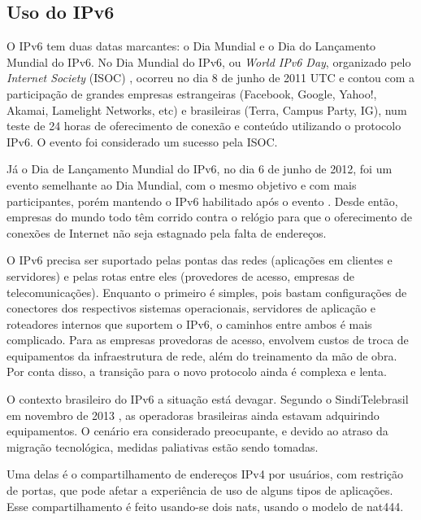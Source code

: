 
\subsection*{Uso do IPv6}

O IPv6 tem duas datas marcantes: o Dia Mundial e o Dia do Lançamento Mundial do IPv6.
No Dia Mundial do IPv6, ou \emph{World IPv6 Day}, organizado pelo
\emph{Internet Society} (ISOC) \cite{site:isoc-ipv6day}, ocorreu no dia 8 de junho de
2011 UTC e contou com a participação de grandes empresas estrangeiras (Facebook,
Google, Yahoo!, Akamai, Lamelight Networks, etc) e brasileiras (Terra, Campus Party,
IG), num teste de 24 horas de oferecimento de conexão e conteúdo utilizando o protocolo
IPv6. O evento foi considerado um sucesso pela ISOC.

Já o Dia de Lançamento Mundial do IPv6, no dia 6 de junho de 2012, foi um evento
semelhante ao Dia Mundial, com o mesmo objetivo e com mais participantes, porém mantendo
o IPv6 habilitado após o evento \cite{site:isoc-ipv6launch}. Desde então, empresas do
mundo todo têm corrido contra o relógio para que o oferecimento de conexões de Internet
não seja estagnado pela falta de endereços.

O IPv6 precisa ser suportado pelas pontas das redes (aplicações em clientes e
servidores) e pelas rotas entre eles (provedores de acesso, empresas de
telecomunicações). Enquanto o primeiro é simples, pois bastam configurações de
conectores dos respectivos sistemas operacionais, servidores de aplicação e roteadores
internos que suportem o IPv6, o caminhos entre ambos é mais complicado. Para as empresas
provedoras de acesso, envolvem custos de troca de equipamentos da infraestrutura de
rede, além do treinamento da mão de obra. Por conta disso, a transição para o novo
protocolo ainda é complexa e lenta.

O contexto brasileiro do IPv6 a situação está devagar. Segundo o SindiTelebrasil em
novembro de 2013 \cite{site:ipv6brasil}, as operadoras brasileiras ainda estavam
adquirindo equipamentos. O cenário era considerado preocupante, e devido ao atraso da
migração tecnológica, medidas paliativas estão sendo tomadas.

Uma delas é o compartilhamento de endereços IPv4 por usuários, com restrição de portas,
que pode afetar a experiência de uso de alguns tipos de aplicações. Esse
compartilhamento é feito usando-se dois \glspl*{nat}, usando o modelo de \gls*{nat}444.

